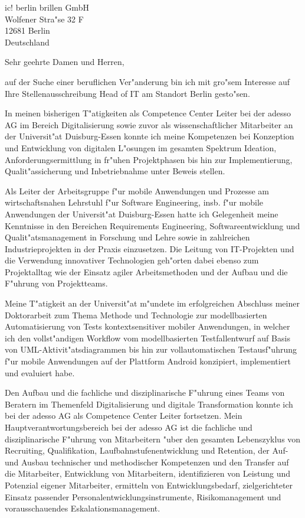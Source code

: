 \documentclass[10pt,a4paper]{dinbrief}
\date{\today}
\begin{document}
 
\begin{letter}  
{%
	ic! berlin brillen GmbH\\
	Wolfener Stra"se 32 F\\
	12681 Berlin\\
	Deutschland
}
\subject{\bf Bewerbung Head of IT}
\opening{Sehr geehrte Damen und Herren,}
auf der Suche einer beruflichen Ver"anderung bin ich mit gro"sem Interesse auf Ihre Stellenausschreibung Head of IT am Standort Berlin gesto"sen. 

In meinen bisherigen T"atigkeiten als Competence Center Leiter bei der adesso AG im Bereich Digitalisierung sowie zuvor als wissenschaftlicher Mitarbeiter an der Universit"at Duisburg-Essen konnte ich meine Kompetenzen bei Konzeption und Entwicklung von digitalen L"osungen im gesamten Spektrum Ideation, Anforderungsermittlung in fr"uhen Projektphasen bis hin zur Implementierung, Qualit"assicherung und Inbetriebnahme unter Beweis stellen.

Als Leiter der Arbeitsgruppe f"ur mobile Anwendungen und Prozesse am wirtschaftsnahen Lehrstuhl f"ur Software Engineering, insb. f"ur mobile Anwendungen der Universit"at Duisburg-Essen hatte ich Gelegenheit meine Kenntnisse in den Bereichen Requirements Engineering, Softwareentwicklung und Qualit"atsmanagement in Forschung und Lehre sowie in zahlreichen Industrieprojekten in der Praxis einzusetzen. Die Leitung von IT-Projekten und die Verwendung innovativer Technologien geh"orten dabei ebenso zum Projektalltag wie der Einsatz agiler Arbeitsmethoden und der Aufbau und die F"uhrung von Projektteams.

Meine T"atigkeit an der Universit"at m"undete im erfolgreichen Abschluss meiner Doktor\-arbeit zum Thema Methode und Technologie zur modellbasierten Automatisierung von Tests kontextsensitiver mobiler Anwendungen, in welcher ich den vollst"andigen Workflow vom modellbasierten Testfallentwurf auf Basis von UML-Aktivit"atsdiagrammen bis hin zur vollautomatischen Testausf"uhrung f"ur mobile Anwendungen auf der Plattform Android konzipiert, implementiert und evaluiert habe.

\clearpage
Den Aufbau und die fachliche und disziplinarische F"uhrung eines Teams von Beratern im Themenfeld Digitalisierung und digitale Transformation konnte ich bei der adesso AG als Competence Center Leiter fortsetzen. Mein Hauptverantwortungsbereich bei der adesso AG ist die fachliche und disziplinarische F"uhrung von Mitarbeitern "uber den gesamten Lebenszyklus von Recruiting, Qualifikation, Laufbahnstufenentwicklung und Retention, der Auf- und Ausbau technischer und methodischer Kompetenzen und den Transfer auf die Mitarbeiter, Entwicklung von Mitarbeitern, identifizieren von Leistung und Potenzial eigener Mitarbeiter, ermitteln von  Entwicklungsbedarf, zielgerichteter Einsatz passender Personalentwicklungsinstrumente, Risikomanagement und vorausschauendes Eskalationsmanagement.



\end{letter}
\end{document}
